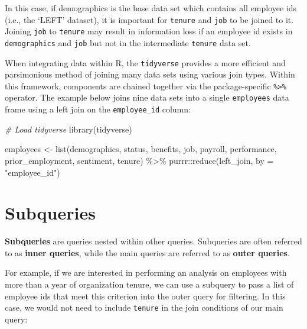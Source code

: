 \documentclass[
]{book}
\newenvironment{Shaded}{\begin{snugshade}}{\end{snugshade}}
\newcommand{\AttributeTok}[1]{\textcolor[rgb]{0.77,0.63,0.00}{#1}}
\newcommand{\CommentTok}[1]{\textcolor[rgb]{0.56,0.35,0.01}{\textit{#1}}}
\newcommand{\FunctionTok}[1]{\textcolor[rgb]{0.00,0.00,0.00}{#1}}
\newcommand{\NormalTok}[1]{#1}
\newcommand{\OtherTok}[1]{\textcolor[rgb]{0.56,0.35,0.01}{#1}}
\newcommand{\SpecialCharTok}[1]{\textcolor[rgb]{0.00,0.00,0.00}{#1}}
\newcommand{\StringTok}[1]{\textcolor[rgb]{0.31,0.60,0.02}{#1}}
\begin{document}
In this case, if demographics is the base data set which contains all employee ids (i.e., the `LEFT' dataset), it is important for \texttt{tenure} and \texttt{job} to be joined to it. Joining \texttt{job} to \texttt{tenure} may result in information loss if an employee id exists in \texttt{demographics} and \texttt{job} but not in the intermediate \texttt{tenure} data set.

When integrating data within R, the \texttt{tidyverse} provides a more efficient and parsimonious method of joining many data sets using various join types. Within this framework, components are chained together via the package-specific \texttt{\%\textgreater{}\%} operator. The example below joins nine data sets into a single \texttt{employees} data frame using a left join on the \texttt{employee\_id} column:

\begin{Shaded}
\begin{Highlighting}[]
\CommentTok{\# Load tidyverse}
\FunctionTok{library}\NormalTok{(tidyverse)}

\NormalTok{employees }\OtherTok{\textless{}{-}} \FunctionTok{list}\NormalTok{(demographics,}
\NormalTok{                  status,}
\NormalTok{                  benefits,}
\NormalTok{                  job,}
\NormalTok{                  payroll,}
\NormalTok{                  performance,}
\NormalTok{                  prior\_employment,}
\NormalTok{                  sentiment,}
\NormalTok{                  tenure) }\SpecialCharTok{\%\textgreater{}\%}
\NormalTok{                  purrr}\SpecialCharTok{::}\FunctionTok{reduce}\NormalTok{(left\_join, }\AttributeTok{by =} \StringTok{"employee\_id"}\NormalTok{)}
\end{Highlighting}
\end{Shaded}

\hypertarget{subqueries}{%
\section{Subqueries}\label{subqueries}}

\textbf{Subqueries} are queries nested within other queries. Subqueries are often referred to as \textbf{inner queries}, while the main queries are referred to as \textbf{outer queries}.

For example, if we are interested in performing an analysis on employees with more than a year of organization tenure, we can use a subquery to pass a list of employee ids that meet this criterion into the outer query for filtering. In this case, we would not need to include \texttt{tenure} in the join conditions of our main query:
\end{document}
